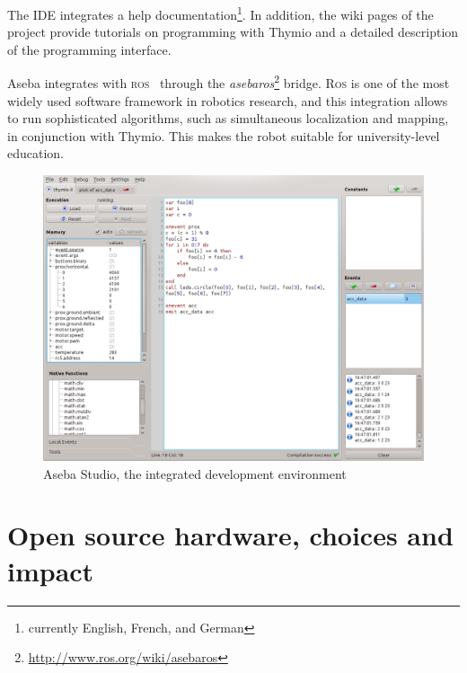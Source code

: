 \documentclass[letterpaper, 10 pt, conference]{ieeeconf}  %
\begin{document}
The IDE integrates a help documentation\footnote{currently English, French, and German}.
In addition, the wiki pages of the project provide tutorials on programming with Thymio and a detailed description of the programming interface.

Aseba integrates with \textsc{ros}~\cite{quigley2009ros} through the \emph{asebaros}\footnote{\url{http://www.ros.org/wiki/asebaros}} bridge.
\textsc{Ros} is one of the most widely used software framework in robotics research, and this integration allows to run sophisticated algorithms, such as simultaneous localization and mapping, in conjunction with  Thymio.
This makes the robot suitable for university-level education.

\begin{figure}
\centering
\includegraphics[width=.9\columnwidth]{figures/aseba-studio}
\caption{Aseba Studio, the integrated development environment}
\label{fig:aseba-studio}
\end{figure}

\section{Open source hardware, choices and impact}
\end{document}
